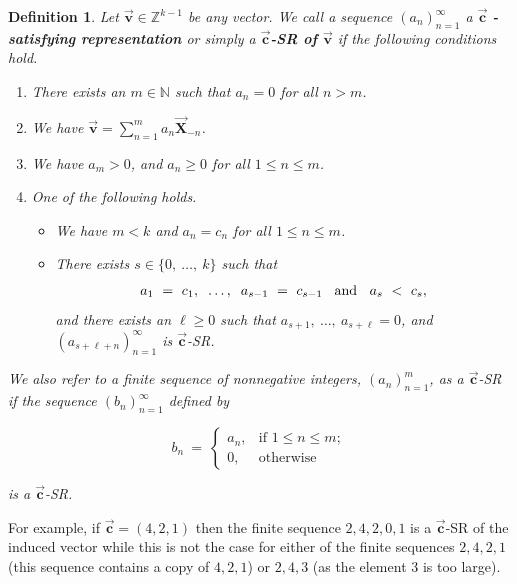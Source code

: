 \documentclass[]{interact}
\newcommand{\vtr}[1]{\vec{\mathbf{#1}}}
\theoremstyle{plain}
\numberwithin{equation}{section} %
\newtheorem{definition}[thm]{Definition}
\numberwithin{table}{section} %
\numberwithin{figure}{section}
\begin{document}
\begin{definition}
\label{defintion:SR}
    Let $\vtr{v} \in \mathbb{Z}^{k-1}$ be any vector. We call a sequence $(a_n)_{n = 1}^{\infty}$ a $\vtr{c}$ \textbf{\textit{- satisfying representation}} or simply a \textbf{$\vtr{c}$-SR of $\vtr{v}$ }if the following conditions hold. 
    \begin{enumerate}
        \item  There exists an $m\in \mathbb{N}$ such that $a_n=0$ for all $n>m$.
        \item We have $\vtr{v} = \sum_{n = 1}^m a_n \vtr{X}_{-n}$.
        \item We have $a_m > 0$, and $a_n \geq 0$ for all $1\leq n \leq m$.
        \item One of the following holds. \begin{itemize}
                \item We have $m < k$ and $a_n = c_n$ for all $1 \leq n \leq m$.
                \item There exists $s \in \{0, \ \ldots, \ k\}$ such that
                \begin{equation}
                    a_1\ =\ c_1,\hspace{0.2cm} \ldots, \hspace{0.2cm} a_{s-1}\ =\ c_{s-1} \hspace{0.3cm} \text{and }\hspace{0.2cm} a_s\ <\ c_s,
                \end{equation}
                 and there exists an $ \ell \geq 0$ such that $a_{s+1},\ \ldots, \ a_{s+\ell} = 0$, and $(a_{s+ \ell +n} )_{n=1}^{\infty}$ is $\vtr{c}$-SR.
            \end{itemize}
    \end{enumerate}
    We also refer to a finite sequence of nonnegative integers, $(a_n)_{n=1}^m$, as a $\vtr{c}$-SR if the sequence $(b_n)_{n=1}^\infty$ defined by

    \[b_n\ =\ \begin{cases}
        a_n, & \text{if }1\leq n\leq m; \\
        0, & \text{otherwise}
    \end{cases}\]

    \noindent is a $\vtr{c}$-SR.

\end{definition}
 
For example, if $\vtr{c}=(4,2,1)$ then the finite sequence $2,4,2,0,1$ is a $\vtr{c}$-SR of the induced vector while this is not the case for either of the finite sequences $2,4,2,1$ (this sequence contains a copy of $4,2,1$) or $2,4,3$ (as the element $3$ is too large).
\end{document}
